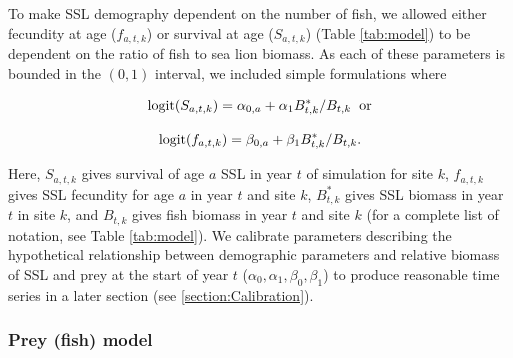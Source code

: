 \documentclass[nonumbib,leqno]{nrc1}
\begin{document}
To make SSL demography dependent on the number of fish, we allowed either fecundity at age ($f_{a,t,k}$) or survival at age ($S_{a,t,k}$) (Table \ref{tab:model}) to be dependent on the ratio of fish to sea lion biomass.  As each of these parameters is bounded in the $(0,1)$ interval, we included simple formulations where
\begin{linenomath}
\begin{equation*}
{\rm logit}(S_{a,t,k})=\alpha_{0,a} + \alpha_1 B_{t,k}^*/B_{t,k} \hspace{2mm} {\rm or}
\end{equation*}
\end{linenomath}
\begin{linenomath}
\begin{equation*}
{\rm logit}(f_{a,t,k})=\beta_{0,a} + \beta_1 B_{t,k}^*/B_{t,k}.
\end{equation*}
\end{linenomath}
Here, $S_{a,t,k}$ gives survival of age $a$ SSL in year $t$ of simulation for site $k$, $f_{a,t,k}$ gives SSL fecundity for age $a$ in year $t$ and site $k$, $B_{t,k}^*$ gives SSL biomass in year $t$ in site $k$, and $B_{t,k}$ gives fish biomass in year $t$ and site $k$ (for a complete list of notation, see Table \ref{tab:model}).  We calibrate parameters describing the hypothetical relationship between demographic parameters and relative biomass of SSL and prey at the start of year $t$ ($\alpha_0,\alpha_1,\beta_0,\beta_1$) to produce reasonable time series in a later section (see \ref{section:Calibration}).

\subsubsection{Prey (fish) model}
\end{document}
